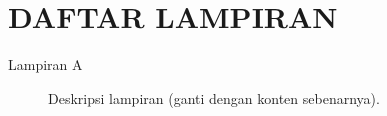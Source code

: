 \chapter*{DAFTAR LAMPIRAN}

\noindent
\begin{description}
    \item[Lampiran A] Deskripsi lampiran (ganti dengan konten sebenarnya).
\end{description}